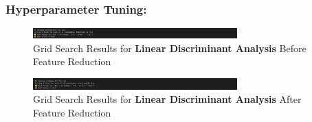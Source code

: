 \documentclass[a4paper,12pt]{article}
\begin{document}
\subsubsection{Hyperparameter Tuning:}
\begin{figure}[H]
    \centering
    \includegraphics[width=0.7\textwidth]{./images/gslda1.png}
    \caption{Grid Search Results for \textbf{Linear Discriminant Analysis} Before Feature Reduction}
    \label{fig:fig_27}
\end{figure}
\begin{figure}[H]
    \centering
    \includegraphics[width=0.7\textwidth]{./images/gslda2.png}
    \caption{Grid Search Results for \textbf{Linear Discriminant Analysis} After Feature Reduction}
    \label{fig:fig_28}
\end{figure}
\end{document}
